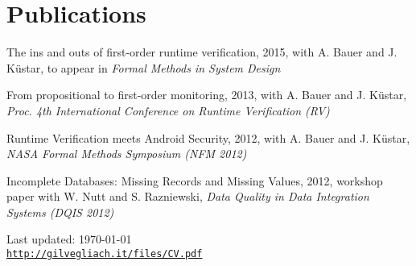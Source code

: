 \documentclass[letterpaper]{article}
\def\footerlink{http://gilvegliach.it/files/CV.pdf}
\newenvironment{no-indent-itemize}{
  \begin{list}{}{
    \setlength{\leftmargin}{0em}
  }
}{
  \end{list}
}
\begin{document}
\section*{Publications}
\begin{no-indent-itemize}
  \item The ins and outs of first-order runtime verification, 2015, with A. Bauer and J. K\"{u}star, 
        to appear in {\it Formal Methods in System Design}
  \item From propositional to first-order monitoring, 2013, with A. Bauer and J. K\"{u}star, 
        {\it Proc. 4th International Conference on Runtime Verification (RV)}
  \item Runtime Verification meets Android Security, 2012, with A. Bauer and J. K\"{u}star, 
        {\it NASA Formal Methods Symposium (NFM 2012)}
  \item Incomplete Databases: Missing Records and Missing Values, 2012, workshop paper with 
        W. Nutt and S. Razniewski, {\it Data Quality in Data Integration Systems (DQIS 2012)}
\end{no-indent-itemize}

\bigskip
\begin{center}
  \begin{footnotesize}
    Last updated: \today \\
    \href{\footerlink}{\texttt{\footerlink}}
  \end{footnotesize}
\end{center}
\end{document}
